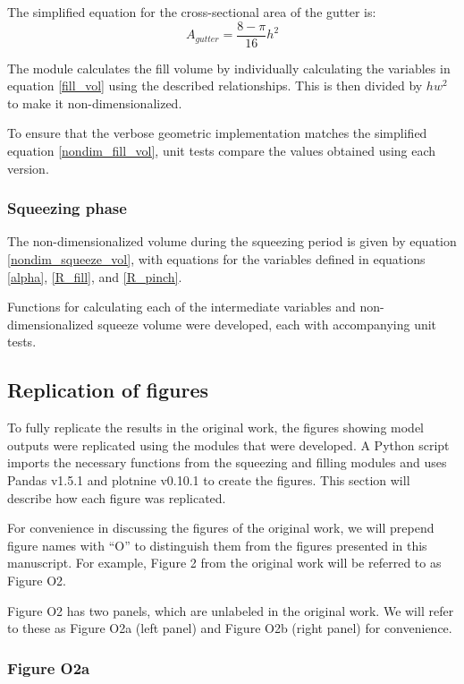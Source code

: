 \noindent The simplified equation for the cross-sectional area of the gutter is:
$$A_{gutter} = \frac{8-\pi}{16}h^2$$

\noindent The module calculates the fill volume by individually calculating the variables in equation
\eqref{fill_vol} using the described relationships.
This is then divided by $hw^2$ to make it non-dimensionalized.

To ensure that the verbose geometric implementation matches the simplified equation \eqref{nondim_fill_vol}, 
unit tests compare the values obtained using each version.

\subsubsection{Squeezing phase}
The non-dimensionalized volume during the squeezing period is given by equation \eqref{nondim_squeeze_vol}, with
equations for the variables defined in equations \eqref{alpha}, \eqref{R_fill}, and \eqref{R_pinch}.

Functions for calculating each of the intermediate variables and non-dimensionalized squeeze volume
were developed, each with accompanying unit tests.

\subsection{Replication of figures}

To fully replicate the results in the original work, the figures showing model outputs were
replicated using the modules that were developed. A Python script imports the necessary
functions from the squeezing and filling modules and uses Pandas\supercite{team_pandas_2020} v1.5.1
and plotnine\supercite{kibirige_plotnine_2022} v0.10.1 to create the figures.
This section will describe how each figure was replicated.

For convenience in discussing the figures of the original work, we will prepend figure names
with “O” to distinguish them from the figures presented in this manuscript. For example, Figure 2 from
the original work will be referred to as Figure O2.

Figure O2 has two panels, which are unlabeled in the original work. We will refer to these as Figure O2a
(left panel) and Figure O2b (right panel) for convenience.

\subsubsection{Figure O2a}

